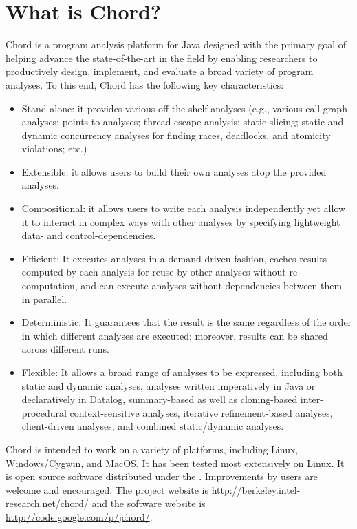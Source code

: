 \section{What is Chord?}
\label{sec:whatis-chord}

Chord is a program analysis platform for Java designed with the
primary goal of helping advance the state-of-the-art in the field by
enabling researchers to productively design, implement, and evaluate a
broad variety of program analyses. To this end, Chord has the
following key characteristics:

\begin{itemize}
\item
Stand-alone: it provides various off-the-shelf analyses (e.g., various
call-graph analyses; points-to analyses; thread-escape analysis;
static slicing; static and dynamic concurrency analyses for finding
races, deadlocks, and atomicity violations; etc.)
\item
Extensible: it allows users to build their own analyses atop the
provided analyses.
\item
Compositional: it allows users to write each analysis independently
yet allow it to interact in complex ways with other analyses by
specifying lightweight data- and control-dependencies.
\item
Efficient: It executes analyses in a demand-driven fashion, caches
results computed by each analysis for reuse by other analyses without
re-computation, and can execute analyses without dependencies between
them in parallel.
\item
Deterministic: It guarantees that the result is the same regardless of
the order in which different analyses are executed; moreover, results
can be shared across different runs.
\item
Flexible: It allows a broad range of analyses to be expressed,
including both static and dynamic analyses, analyses written
imperatively in Java or declaratively in Datalog, summary-based as
well as cloning-based inter-procedural context-sensitive analyses,
iterative refinement-based analyses, client-driven analyses, and
combined static/dynamic analyses.
\end{itemize}

\noindent Chord is intended to work on a variety of platforms,
including Linux, Windows/Cygwin, and MacOS.  It has been tested most
extensively on Linux.  It is open source software distributed under
the .
Improvements by users are welcome and encouraged.  The project website
is \url{http://berkeley.intel-research.net/chord/} and the software
website is \url{http://code.google.com/p/jchord/}.



